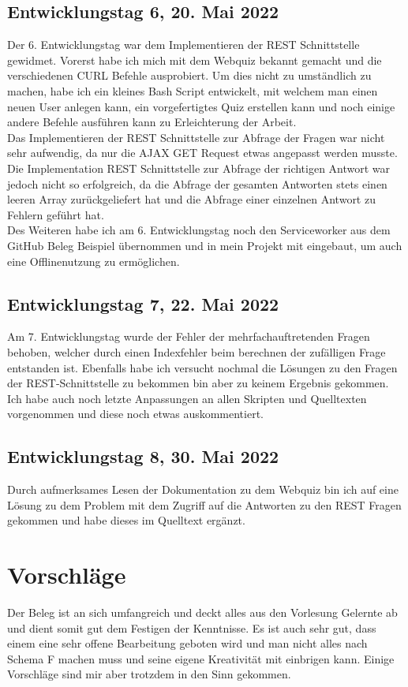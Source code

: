 \documentclass[a4paper,12pt,titlepage]{scrartcl}
\begin{document}
        \subsection{Entwicklungstag 6, 20. Mai 2022}
            Der 6. Entwicklungstag war dem Implementieren der REST Schnittstelle gewidmet. Vorerst habe ich mich mit dem Webquiz bekannt gemacht und die verschiedenen CURL Befehle ausprobiert. Um dies nicht zu umständlich zu machen, habe ich ein kleines Bash Script entwickelt, mit welchem man einen neuen User anlegen kann, ein vorgefertigtes Quiz erstellen kann und noch einige andere Befehle ausführen kann zu Erleichterung der Arbeit.\\
            Das Implementieren der REST Schnittstelle zur Abfrage der Fragen war nicht sehr aufwendig, da nur die AJAX GET Request etwas angepasst werden musste. Die Implementation REST Schnittstelle zur Abfrage der richtigen Antwort war jedoch nicht so erfolgreich, da die Abfrage der gesamten Antworten stets einen leeren Array zurückgeliefert hat und die Abfrage einer einzelnen Antwort zu Fehlern geführt hat.\\
            Des Weiteren habe ich am 6. Entwicklungstag noch den Serviceworker aus dem GitHub Beleg Beispiel übernommen und in mein Projekt mit eingebaut, um auch eine Offlinenutzung zu ermöglichen.
        \subsection{Entwicklungstag 7, 22. Mai 2022}
            Am 7. Entwicklungstag wurde der Fehler der mehrfachauftretenden Fragen behoben, welcher durch einen Indexfehler beim berechnen der zufälligen Frage entstanden ist.
            Ebenfalls habe ich versucht nochmal die Lösungen zu den Fragen der REST-Schnittstelle zu bekommen bin aber zu keinem Ergebnis gekommen.
            Ich habe auch noch letzte Anpassungen an allen Skripten und Quelltexten vorgenommen und diese noch etwas auskommentiert.
        \subsection{Entwicklungstag 8, 30. Mai 2022}
            Durch aufmerksames Lesen der Dokumentation zu dem Webquiz bin ich auf eine Lösung zu dem Problem mit dem Zugriff auf die Antworten zu den REST Fragen gekommen und habe dieses im Quelltext ergänzt.
    \newpage
    \section{Vorschläge}
        Der Beleg ist an sich umfangreich und deckt alles aus den Vorlesung Gelernte ab und dient somit gut dem Festigen der Kenntnisse. Es ist auch sehr gut, dass einem eine sehr offene Bearbeitung geboten wird und man nicht alles nach Schema F machen muss und seine eigene Kreativität mit einbrigen kann. Einige Vorschläge sind mir aber trotzdem in den Sinn gekommen.
\end{document}
